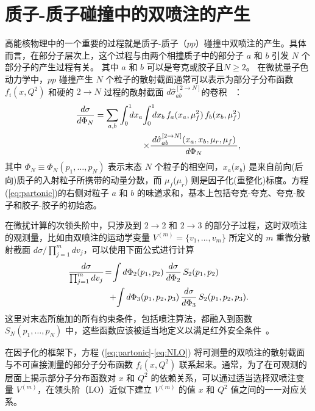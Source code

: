 \section{质子-质子碰撞中的双喷注的产生}
\label{sec:pp}

	高能核物理中的一个重要的过程就是质子-质子（$pp$）碰撞中双喷注的产生。具体而言，在部分子层次上，这个过程与由两个相撞质子中的部分子 $a$ 和 $b$ 引发 $N$ 个部分子的产生过程有关。 其中 $a$ 和 $b$ 可以是夸克或胶子且$N\geq2$。
	在微扰量子色动力学中，$pp$ 碰撞产生 $N$ 个粒子的散射截面通常可以表示为部分子分布函数 $f_i(x,Q^2)$ 和硬的 $2\!\rightarrow\!N$ 过程的散射截面  $d\hat{\sigma}^{[2\rightarrow N]}_{ab}$的卷积~\parencite{Gao:2012he} ：
\begin{align}
  \frac{d\sigma}{d\Phi_N}=\sum_{a,b}\int_0^1 \!\!\!dx_a\!\int_0^1 \!\!\!dx_b
  \,f_a(x_a,\mu^2_f)\,f_b(x_b,\mu^2_f)\cr
  \times\frac{\,d\hat{\sigma}^{[2\rightarrow N]}_{ab}(x_a,x_b,\mu_r,\mu_f)\,}{d\Phi_N},
  \label{eq:partonic}
\end{align}
其中 $\Phi_N\equiv\Phi_N(p_1,\ldots,p_N)$ 表示末态 $N$ 个粒子的相空间，$x_a$($x_b$) 是来自前向(后向)质子的入射粒子所携带的动量分数，而 $\mu_f$($\mu_r$) 则是因子化(重整化)标度。方程(\ref{eq:partonic})的右侧对粒子 $a$ 和 $b$ 的味道求和，基本上包括夸克-夸克、夸克-胶子和胶子-胶子的初始态。

在微扰计算的次领头阶中，只涉及到 $2\rightarrow2$ 和 $2\rightarrow3$ 的部分子过程，这时双喷注的观测量，比如由双喷注的运动学变量 $V^{(m)}=\{v_1,\ldots,v_m\}$ 所定义的 $m$ 重微分散射截面 ${d\sigma}/{\prod_{j=1}^{m} dv_j}$，可以使用下面公式进行计算~\parencite{Gao:2012he}
\begin{align}
  \frac{d\sigma}{\prod_{j=1}^{m} dv_j}\!=\!\int d\Phi_2(p_1,p_2)\,\frac{d\sigma}{d\Phi_2}\,S_2(p_1,p_2)
  \,\,\,\,\,\,\,\,\,\,\,\,\,\,\,\,\,\,\,\,\,\cr
  +\!\int d\Phi_3(p_1,p_2,p_3)\,\frac{d\sigma}{d\Phi_3}\,S_2(p_1,p_2,p_3).
  \label{eq:NLO}
\end{align}
这里对末态所施加的所有约束条件，包括喷注算法，都融入到函数 $S_N(p_1,\ldots,p_N)$ 中，这些函数应该被适当地定义以满足红外安全条件~\parencite{Gao:2012he}。

在因子化的框架下，方程 (\ref{eq:partonic}-\ref{eq:NLO}) 将可测量的双喷注的散射截面与不可直接测量的部分子分布函数 $f_i(x,Q^2)$ 联系起来。通常，为了在可观测的层面上揭示部分子分布函数对 $x$ 和 $Q^2$ 的依赖关系，可以通过适当选择双喷注变量 $V^{(m)}$，在领头阶（LO）近似下建立 $V^{(m)}$ 的值 $x$ 和 $Q^2$ 值之间的一一对应关系。


